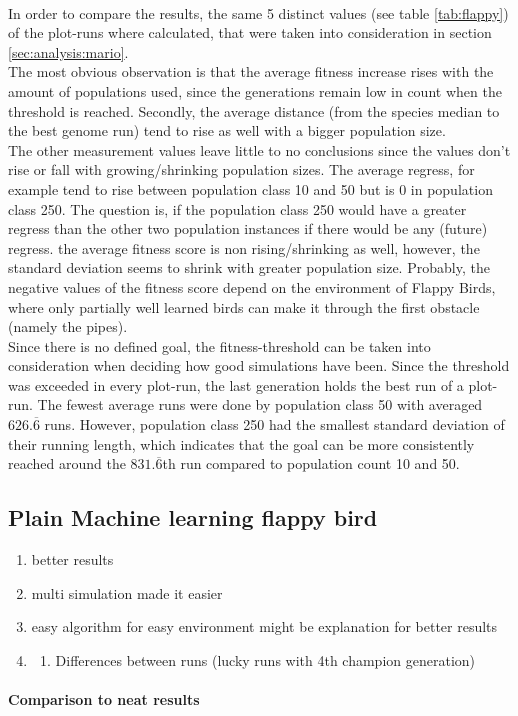 			 \\
			In order to compare the results, the same 5 distinct values (see table \ref{tab:flappy}) of the plot-runs where calculated, that were taken into consideration in section \ref{sec:analysis:mario}.\\
			The most obvious observation is that the average fitness increase rises with the amount of populations used, since the generations remain low in count when the threshold is reached. Secondly, the average distance (from the species median to the best genome run) tend to rise as well with a bigger population size.\\ 
			The other measurement values leave little to no conclusions since the values don't rise or fall with growing/shrinking population sizes. The average regress, for example tend to rise between population class 10 and 50 but is 0 in population class 250. The question is, if the population class 250 would have a greater regress than the other two population instances if there would be any (future) regress. the average fitness score is non rising/shrinking as well, however, the standard deviation seems to shrink with greater population size. Probably, the negative values of the fitness score depend on the environment of Flappy Birds, where only partially well learned birds can make it through the first obstacle (namely the pipes).\\
			Since there is no defined goal, the fitness-threshold can be taken into consideration when deciding how good simulations have been. Since the threshold was exceeded in every plot-run, the last generation holds the best run of a plot-run. The fewest average runs were done by population class 50 with averaged $626.\overline{6}$ runs. However, population class 250 had the smallest standard deviation of their running length, which indicates that the goal can be more consistently reached around the $831.\overline{6}$th run compared to population count 10 and 50.
			
		\subsection{Plain Machine learning flappy bird}
			\begin{enumerate}
				\item better results
				\item multi simulation made it easier
				\item easy algorithm for easy environment might be explanation for better results
				\item \begin{enumerate}
					\item Differences between runs (lucky runs with 4th champion generation)
				\end{enumerate}
			\end{enumerate}
			\paragraph{Comparison to \gls{neat} results}